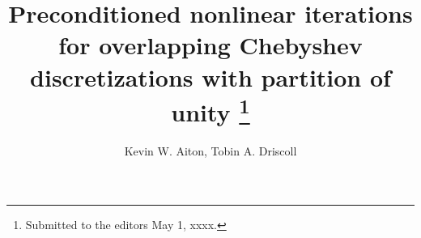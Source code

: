 

\usepackage{lipsum}
\usepackage{amsfonts}
\usepackage{graphicx}
\usepackage{epstopdf}
\usepackage{algorithmic}
\ifpdf
\else
\fi

\newcommand{\creflastconjunction}{, and~}






\title{Preconditioned nonlinear iterations for overlapping Chebyshev discretizations with partition of unity \thanks{Submitted to the editors May 1, xxxx.
}}

\author{Kevin W. Aiton, Tobin A. Driscoll}

\usepackage{amsopn}
\DeclareMathOperator{\diag}{diag}


